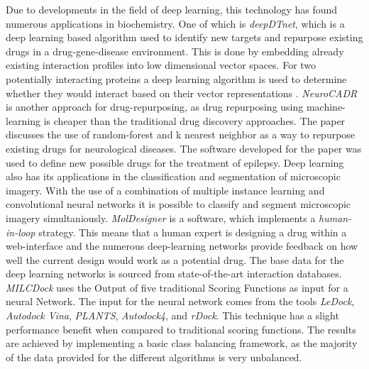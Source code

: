 Due to developments in the field of deep learning, this technology has found numerous applications in biochemistry\cite{Chen2018}.
One of which is \textit{deepDTnet}, which is a deep learning based algorithm used to identify new targets and repurpose existing drugs in a drug-gene-disease environment.
This is done by embedding already existing interaction profiles into low dimensional vector spaces.
For two potentially interacting proteins a deep learning algorithm is used to determine whether they would interact based on their vector representations \cite{Zeng}.
\textit{NeuroCADR} is another approach for drug-repurposing, as drug repurposing using machine-learning is cheaper than the traditional drug discovery approaches.
The paper discusses the use of random-forest and k nearest neighbor as a way to repurpose existing drugs for neurological diseases.
The software developed for the paper was used to define new possible drugs for the treatment of epilepsy.\cite[]{Mamidala2023}
Deep learning also has its applications in the classification and segmentation of microscopic imagery.
With the use of a combination of multiple instance learning and convolutional neural networks it is possible to classify and segment 
microscopic imagery simultaniously\cite{Kraus2016}.
\textit{MolDesigner} is a software, which implements a \textit{human-in-loop} strategy. This means that a human expert is designing a drug within a web-interface and the 
numerous deep-learning networks provide feedback on how well the current design would work as a potential drug.
The base data for the deep learning networks is sourced from state-of-the-art interaction databases\cite[]{Huang2020}.
\textit{MILCDock} uses the Output of five traditional Scoring Functions as input for a neural Network. 
The input for the neural network comes from the tools \textit{LeDock}\cite[]{Zhang2016}, \textit{Autodock Vina}\cite[]{Trott2010}, \textit{PLANTS}\cite[]{Korb2006},  \textit{Autodock4}\cite[]{Morris2009}, and \textit{rDock}\cite[]{RuizCarmona2014}. 
This technique has a slight performance benefit when compared to traditional scoring functions.
The results are achieved by implementing a basic class balancing framework, as the majority of the data provided for the different algorithms is
very unbalanced\cite[]{Morris2022}.
\newpage